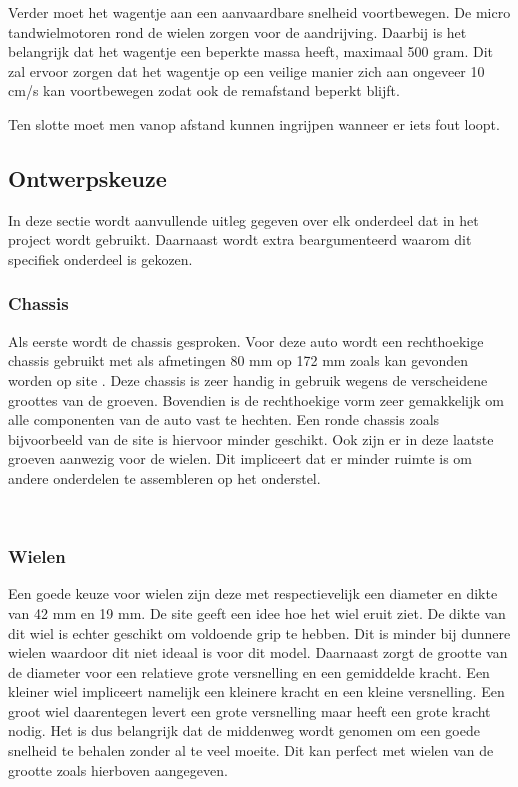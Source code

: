 \documentclass[a4paper,twoside,kulak]{kulakreport} %
\begin{document}
Verder moet het wagentje aan een aanvaardbare snelheid voortbewegen. De micro tandwielmotoren rond de wielen zorgen voor de aandrijving. Daarbij is het belangrijk dat het wagentje een beperkte massa heeft, maximaal 500 gram. Dit zal ervoor zorgen dat het wagentje op een veilige manier zich aan ongeveer 10 cm/s kan voortbewegen zodat ook de remafstand beperkt blijft.

Ten slotte moet men vanop afstand kunnen ingrijpen wanneer er iets fout loopt.





\subsection{Ontwerpskeuze}

In deze sectie wordt aanvullende uitleg gegeven over elk onderdeel dat in het project wordt gebruikt. Daarnaast wordt extra beargumenteerd waarom dit specifiek onderdeel is gekozen.

\subsubsection{Chassis}
Als eerste wordt de chassis gesproken. Voor deze auto wordt een rechthoekige chassis gebruikt met als afmetingen 80 mm op 172 mm zoals kan gevonden worden op site \cite{RobotChassisRechthoekigZwart}. %
Deze chassis is zeer handig in gebruik wegens de verscheidene groottes van de groeven. Bovendien is de rechthoekige vorm zeer gemakkelijk om alle componenten van de auto vast te hechten. Een ronde chassis zoals bijvoorbeeld van de site \cite{RobotChassis} is hiervoor minder geschikt. Ook zijn er in deze laatste groeven aanwezig voor de wielen. Dit impliceert dat er minder ruimte is om andere onderdelen te assembleren op het onderstel. 

~
\subsubsection{Wielen}
Een goede keuze voor wielen zijn deze met respectievelijk een diameter en dikte van 42 mm en 19 mm. De site \cite{Wiel42x19mm} geeft een idee hoe het wiel eruit ziet. De dikte van dit wiel is echter geschikt om voldoende grip te hebben. Dit is minder bij dunnere wielen waardoor dit niet ideaal is voor dit model. Daarnaast zorgt de grootte van de diameter voor een relatieve grote versnelling en een gemiddelde kracht. Een kleiner wiel impliceert namelijk een kleinere kracht en een kleine versnelling. Een groot wiel daarentegen levert een grote versnelling maar heeft een grote kracht nodig. Het is dus belangrijk dat de middenweg wordt genomen om een goede snelheid te behalen zonder al te veel moeite. Dit kan perfect met wielen van de grootte zoals hierboven aangegeven. 
\end{document}
